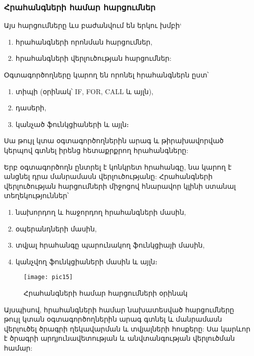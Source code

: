 \subsubsection*{Հրահանգների համար հարցումներ}\label{subsubsec:instructions}

Այս հարցումները ևս բաժանվում են երկու խմբի`
\begin{enumerate}
    \item հրահանգների որոնման հարցումներ,
    \item հրահանգների վերլուծության հարցումներ:
\end{enumerate}

Օգտագործողները կարող են որոնել հրահանգներն ըստ՝
\begin{enumerate}
    \item տիպի (օրինակ՝ IF, FOR, CALL և այլն),
    \item դասերի,
    \item կանչած ֆունկցիաների և այլն։
\end{enumerate}

Սա թույլ կտա օգտագործողներին արագ և թիրախավորված կերպով գտնել իրենց հետաքրքրող հրահանգները:

Երբ օգտագործողն ընտրել է կոնկրետ հրահանգը, նա կարող է անցնել դրա մանրամասն վերլուծությանը:  Հրահանգների վերլուծության հարցումների
միջոցով հնարավոր կլինի ստանալ տեղեկություններ՝
\begin{enumerate}
    \item նախորդող և հաջորդող հրահանգների մասին,
    \item օպերանդների մասին,
    \item տվյալ հրահանգը պարունակող ֆունկցիայի մասին,
    \item կանչվող ֆունկցիաների մասին և այլն։
\end{enumerate}

\begin{figure}[h]
    \centering
    \texttt{[image: pic15]}
    \caption{Հրահանգների համար հարցումների օրինակ}
    \label{fig:figure15}
\end{figure}

Այսպիսով, հրահանգների համար նախատեսված հարցումները թույլ կտան օգտագործողներին արագ գտնել և մանրամասն վերլուծել
ծրագրի ղեկավարման և տվյալների հոսքերը: Սա կարևոր է ծրագրի արդյունավետության և անվտանգության վերլուծման համար:
